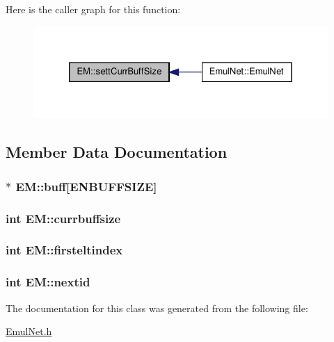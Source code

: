 \-Here is the caller graph for this function\-:
\nopagebreak
\begin{figure}[H]
\begin{center}
\leavevmode
\includegraphics[width=326pt]{db/dfc/class_e_m_a04735702f4943bd77292f2fb8d8b5a7d_icgraph}
\end{center}
\end{figure}




\subsection{\-Member \-Data \-Documentation}
\hypertarget{class_e_m_adf16de55850031c37ec50d40595304e9}{
\subsubsection[{buff}]{$\ast$ {\bf \-E\-M\-::buff}\mbox{[}{\bf \-E\-N\-B\-U\-F\-F\-S\-I\-Z\-E}\mbox{]}}}\label{db/dfc/class_e_m_adf16de55850031c37ec50d40595304e9}
\hypertarget{class_e_m_a8199bc20a63a93126b276a1d968ca72c}{
\subsubsection[{currbuffsize}]{\setlength{\rightskip}{0pt plus 5cm}int {\bf \-E\-M\-::currbuffsize}}}\label{db/dfc/class_e_m_a8199bc20a63a93126b276a1d968ca72c}
\hypertarget{class_e_m_a7c7dfed53d8ee4b28b738f8a4dc47424}{
\subsubsection[{firsteltindex}]{\setlength{\rightskip}{0pt plus 5cm}int {\bf \-E\-M\-::firsteltindex}}}\label{db/dfc/class_e_m_a7c7dfed53d8ee4b28b738f8a4dc47424}
\hypertarget{class_e_m_abe82d3a166960b6c717b29111e337ada}{
\subsubsection[{nextid}]{\setlength{\rightskip}{0pt plus 5cm}int {\bf \-E\-M\-::nextid}}}\label{db/dfc/class_e_m_abe82d3a166960b6c717b29111e337ada}


\-The documentation for this class was generated from the following file\-:\begin{DoxyCompactItemize}
\item 
\hyperlink{_emul_net_8h}{\-Emul\-Net.\-h}\end{DoxyCompactItemize}
